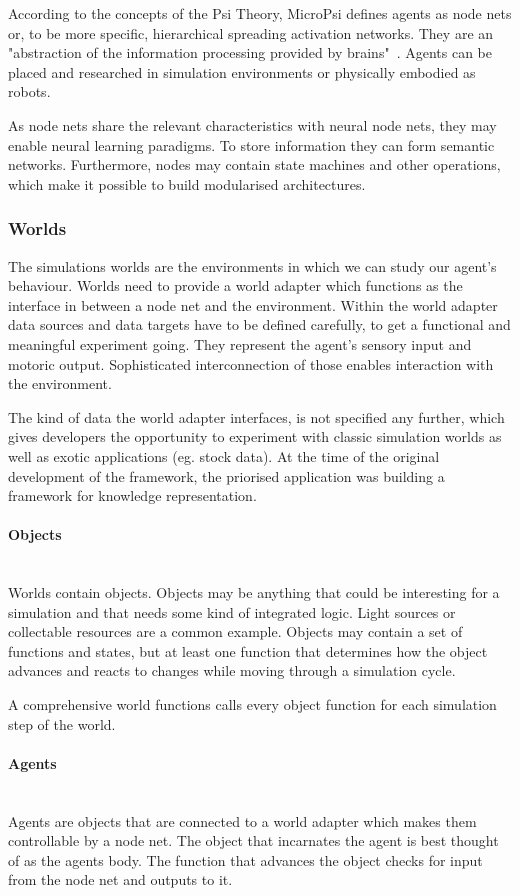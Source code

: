 According to the concepts of the Psi Theory, MicroPsi defines agents as node nets or, to be more specific, hierarchical spreading activation networks. They are an "abstraction of the information processing provided by brains"~\cite{conf/agi/Bach12}. Agents can be placed and researched in simulation environments or physically embodied as robots.

As node nets share the relevant characteristics with neural node nets, they may enable neural learning paradigms. To store information they can form semantic networks. Furthermore, nodes may contain state machines and other operations, which make it possible to build modularised architectures.

        \subsubsection{Worlds}
The simulations worlds are the environments in which we can study our agent's behaviour. Worlds need to provide a world adapter which functions as the interface in between a node net and the environment. Within the world adapter data sources and data targets have to be defined carefully, to get a functional and meaningful experiment going. They represent the agent's sensory input and motoric output. Sophisticated interconnection of those enables interaction with the environment.

The kind of data the world adapter interfaces, is not specified any further, which gives developers the opportunity to experiment with classic simulation worlds as well as exotic applications (eg. stock data). At the time of the original development of the framework, the priorised application was building a framework for knowledge representation.

        \paragraph{Objects}$\;$ \\
Worlds contain objects. Objects may be anything that could be interesting for a simulation and that needs some kind of integrated logic. Light sources or collectable resources are a common example. Objects may contain a set of functions and states, but at least one function that determines how the object advances and reacts to changes while moving through a simulation cycle. 

A comprehensive world functions calls every object function for each simulation step of the world.

        \paragraph{Agents}$\;$ \\
Agents are objects that are connected to a world adapter which makes them controllable by a node net. The object that incarnates the agent is best thought of as the agents body. The function that advances the object checks for input from the node net and outputs to it.
        